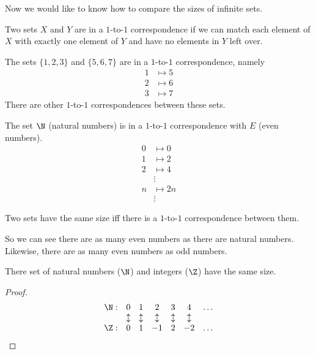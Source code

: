 \message{ !name(truth.tex)}\documentclass{scrbook}
\begin{document}
Now we would like to know how to compare the sizes of infinite sets. 
\begin{defn}
  Two sets $X$ and $Y$ are in a $1$-to-$1$ correspondence if we can match each element of $X$ with exactly one element of $Y$ and have no elements in $Y$ left over. 
\end{defn}
\begin{example}
  The sets $\{1,2,3\}$ and $\{5,6,7\}$ are in a $1$-to-$1$ correspondence, namely 
  \begin{align*}
    1 &\mapsto 5 \\
    2 &\mapsto 6 \\
    3&\mapsto 7
  \end{align*}
  There are other $1$-to-$1$ correspondences between these sets.  
\end{example}
\begin{example}
  The set $\N$ (natural numbers) is in a $1$-to-$1$ correspondence with $E$ (even numbers). 
  \begin{align*}
    0 &\mapsto 0 \\
    1 &\mapsto 2 \\
    2 &\mapsto 4 \\
    &\vdots \\ 
    n & \mapsto 2n \\
    &\vdots 
  \end{align*}
\end{example}
\begin{defn}[size]
  Two sets have the same size iff there is a $1$-to-$1$ correspondence between them. 
\end{defn}
So we can see there are as many even numbers as there are natural numbers. Likewise, there are as many even numbers as odd numbers. 
\begin{theorem}
  There set of natural numbers ($\N$) and integers ($\Z$) have the same size. 
\end{theorem}
\begin{proof}
  \[
  \begin{matrix}
    \N:& 0 & 1 & 2 & 3 & 4 & \dots \\
       & \updownarrow & \updownarrow& \updownarrow&\updownarrow&\updownarrow& \\
    \Z:& 0 & 1 & -1 & 2 & -2 & \dots 
  \end{matrix}
  \]
\end{proof}
\end{document}
